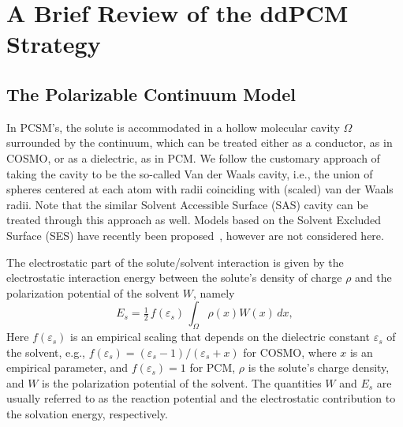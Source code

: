 \documentclass[aip,jcp,a4paper,11pt]{revtex4-1}
\begin{document}
\section{A Brief Review of the ddPCM Strategy}\label{sec:review}

\subsection{The Polarizable Continuum Model}
In PCSM's, the solute is accommodated in a hollow molecular cavity $\Omega$ surrounded by the continuum, which can be treated either as a conductor, as in COSMO, or as a dielectric, as in PCM. We follow the customary approach of taking the cavity to be the so-called Van der Waals cavity\cite{ReviewPCM_2005}, i.e., the union of spheres centered at each atom with radii coinciding with (scaled) van der Waals radii. Note that the similar Solvent Accessible Surface (SAS) cavity can be treated through this approach as well. Models based on the Solvent Excluded Surface (SES) have recently been proposed~\cite{Harbrecht2011,quan2017polarizable,C5CP03410H,JCC:JCC21431}, however are not considered here.

The electrostatic part of the solute/solvent interaction is given by the electrostatic interaction energy between the solute's density of charge $\rho$ and the polarization potential of the solvent $W$, namely
\[
E_s = \tfrac{1}{2}\, f(\varepsilon_s)\,\int_\Omega \rho(x) W(x) \, dx,
\]
Here $f(\varepsilon_s)$ is an empirical scaling that depends on the dielectric constant $\varepsilon_s$ of the solvent, e.g., $f(\varepsilon_s) = (\varepsilon_s - 1)/(\varepsilon_s + x)$ for COSMO, \color{red}where $x$ is an empirical parameter\color{black}, and $f(\varepsilon_s) = 1$ for PCM, $\rho$ is the solute's charge density, and $W$ is the polarization potential of the solvent. The quantities $W$ and $E_s$ are usually referred to as the reaction potential and the electrostatic contribution to the solvation energy, respectively. 
\end{document}
